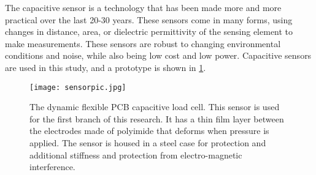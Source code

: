 The capacitive sensor is a technology that has been made more and more practical over the last 20-30 years.
These sensors come in many forms, using changes in distance, area, or dielectric permittivity of the sensing element
to make measurements. These sensors are robust to changing environmental conditions and noise, 
while also being low cost and low power.
Capacitive sensors are used in this study, and a prototype is shown in \ref{fig:flexcell}.

\begin{figure}[ht]
\centering
\texttt{[image: sensorpic.jpg]}
\caption{The dynamic flexible PCB capacitive load cell. 
This sensor is used for the first branch of this research.
It has a thin film layer between the electrodes made of polyimide 
that deforms when pressure is applied. The sensor is housed in a steel case for
protection and additional stiffness and protection from electro-magnetic interference.
}
\label{fig:flexcell}
\end{figure}
